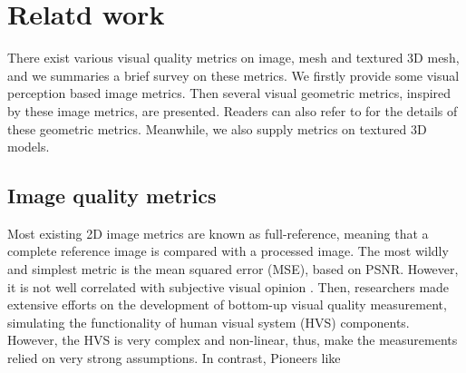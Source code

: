 \section{Relatd work}
There exist various visual quality metrics on image, mesh and textured 3D mesh, and we summaries a brief survey on these metrics. We firstly provide some visual perception based image metrics. Then several visual geometric metrics, inspired by these image metrics, are presented. Readers can also refer to \cite{Corsini_2013} for the details of these geometric metrics.  Meanwhile, we also supply metrics on textured 3D models. 
\subsection{Image quality metrics}
Most existing 2D image metrics are known as full-reference, meaning that a complete reference image is compared with a processed image.  The most wildly and simplest metric is the mean squared error (MSE), based on PSNR. However, it is not well correlated with subjective visual opinion \cite{Snyder_1985} \cite{Teo}. Then, researchers \cite{Mannos_1974} made extensive efforts on the development of bottom-up visual quality measurement, simulating the functionality of human visual system (HVS) components. However, the HVS is very complex and non-linear, thus, make the measurements relied on very strong assumptions. In contrast, Pioneers like

